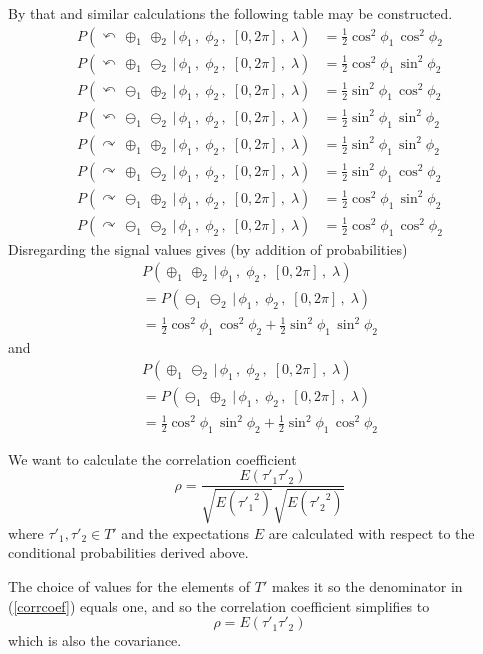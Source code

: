 \documentclass[9pt,technote]{IEEEtran}
\begin{document}
By that and similar calculations the following table may be
constructed.
\begin{align}
  P(\curvearrowleft\,\oplus_1\,\oplus_2\,|\,\phi_1\,,\; \phi_2\,,\; [0,2\pi]\,,\; \lambda) &= \frac{1}{2} \cos^2 \phi_1\, \cos^2 \phi_2 \\
  P(\curvearrowleft\,\oplus_1\,\ominus_2\,|\,\phi_1\,,\; \phi_2\,,\; [0,2\pi]\,,\; \lambda) &= \frac{1}{2} \cos^2 \phi_1\, \sin^2 \phi_2 \\
  P(\curvearrowleft\,\ominus_1\,\oplus_2\,|\,\phi_1\,,\; \phi_2\,,\; [0,2\pi]\,,\; \lambda) &= \frac{1}{2} \sin^2 \phi_1\, \cos^2 \phi_2 \\
  P(\curvearrowleft\,\ominus_1\,\ominus_2\,|\,\phi_1\,,\; \phi_2\,,\; [0,2\pi]\,,\; \lambda) &= \frac{1}{2} \sin^2 \phi_1\, \sin^2 \phi_2 \\
  P(\curvearrowright\,\oplus_1\,\oplus_2\,|\,\phi_1\,,\; \phi_2\,,\; [0,2\pi]\,,\; \lambda) &= \frac{1}{2} \sin^2 \phi_1\, \sin^2 \phi_2 \\
  P(\curvearrowright\,\oplus_1\,\ominus_2\,|\,\phi_1\,,\; \phi_2\,,\; [0,2\pi]\,,\; \lambda) &= \frac{1}{2} \sin^2 \phi_1\, \cos^2 \phi_2 \\
  P(\curvearrowright\,\ominus_1\,\oplus_2\,|\,\phi_1\,,\; \phi_2\,,\; [0,2\pi]\,,\; \lambda) &= \frac{1}{2} \cos^2 \phi_1\, \sin^2 \phi_2 \\
  P(\curvearrowright\,\ominus_1\,\ominus_2\,|\,\phi_1\,,\; \phi_2\,,\; [0,2\pi]\,,\; \lambda) &= \frac{1}{2} \cos^2 \phi_1\, \cos^2 \phi_2
\end{align}
Disregarding the signal values gives (by addition of probabilities)
\begin{multline}
  P(\oplus_1\,\oplus_2\,|\,\phi_1\,,\; \phi_2\,,\; [0,2\pi]\,,\; \lambda) \\
  = P(\ominus_1\,\ominus_2\,|\,\phi_1\,,\; \phi_2\,,\; [0,2\pi]\,,\; \lambda) \\
  = \frac{1}{2} \cos^2 \phi_1\, \cos^2 \phi_2 + \frac{1}{2} \sin^2 \phi_1\, \sin^2 \phi_2
\end{multline}
and
\begin{multline}
  P(\oplus_1\,\ominus_2\,|\,\phi_1\,,\; \phi_2\,,\; [0,2\pi]\,,\; \lambda) \\
  = P(\ominus_1\,\oplus_2\,|\,\phi_1\,,\; \phi_2\,,\; [0,2\pi]\,,\; \lambda) \\
  = \frac{1}{2} \cos^2 \phi_1\, \sin^2 \phi_2 + \frac{1}{2} \sin^2 \phi_1\, \cos^2 \phi_2
\end{multline}

We want to calculate the correlation coefficient
\begin{equation}
  \label{corrcoef}
  \rho = \frac{E(\tau'_1 \tau'_2)}{\sqrt{E({\tau'_1}^2)}\sqrt{E({\tau'_2}^2)}}
\end{equation}
where $\tau'_1, \tau'_2 \in T'$ and the expectations $E$ are
calculated with respect to the conditional probabilities derived
above.

The choice of values for the elements of $T'$ makes it so the
denominator in (\ref{corrcoef}) equals one, and so the correlation
coefficient simplifies to
\begin{equation}
  \rho = E(\tau'_1 \tau'_2)
\end{equation}
which is also the covariance.
\end{document}
